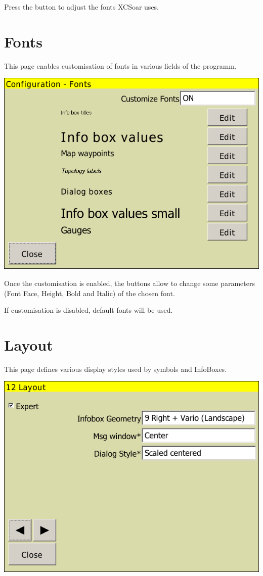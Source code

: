 \documentclass[a4paper,12pt]{refrep}
\begin{document}
Press the  button to adjust the fonts XCSoar uses.


\clearpage
\section{Fonts}

This page enables customisation of fonts in various fields of the programm.

\begin{center}
\includegraphics[angle=0,width=0.8\linewidth,keepaspectratio='true']{figures/config-fonts.png}
\end{center}

Once the customisation is enabled, the  buttons allow to change some parameters (Font 
Face, Height, Bold and Italic) of the chosen font.

If customisation is disabled, default fonts will be used.

\clearpage
\section{Layout}

This page defines various display styles used by symbols and InfoBoxes.

\begin{center}
\includegraphics[angle=0,width=0.8\linewidth,keepaspectratio='true']{figures/config-layout.png}
\end{center}
\end{document}
